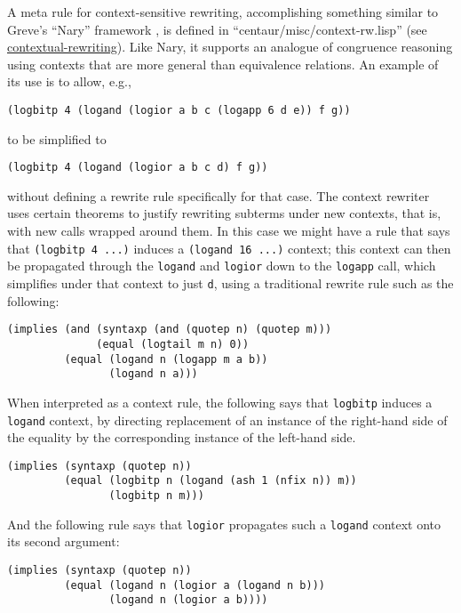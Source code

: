 A meta rule for context-sensitive rewriting, accomplishing something
similar to Greve's ``Nary'' framework \cite{greve06}, is defined in
``centaur/misc/context-rw.lisp'' (see
\href{http://www.cs.utexas.edu/users/moore/acl2/manuals/current/manual/index.html?topic=ACL2\_\_\_\_CONTEXTUAL-REWRITING}{\underline{contextual-rewriting}}).
Like Nary, it supports an analogue of congruence reasoning using
contexts that are more general than equivalence relations.  An example
of its use is to allow, e.g.,
\begin{verbatim}
(logbitp 4 (logand (logior a b c (logapp 6 d e)) f g))
\end{verbatim}
\noindent to be simplified to
\begin{verbatim}
(logbitp 4 (logand (logior a b c d) f g))
\end{verbatim}
without defining a rewrite rule specifically for that case. The
context rewriter uses certain theorems to justify rewriting subterms
under new contexts, that is, with new calls wrapped around them.  In
this case we might have a rule that says that \texttt{(logbitp 4 ...)}
induces a \texttt{(logand 16 ...)} context; this context can then be
propagated through the \texttt{logand} and \texttt{logior} down to the
\texttt{logapp} call, which simplifies under that context to just
\texttt{d}, using a traditional rewrite rule such as the following:
\begin{verbatim}
(implies (and (syntaxp (and (quotep n) (quotep m)))
              (equal (logtail m n) 0))
         (equal (logand n (logapp m a b))
                (logand n a)))
\end{verbatim}
\noindent When interpreted as a context rule, the following says that
\texttt{logbitp} induces a \texttt{logand} context, by directing
replacement of an instance of the right-hand side of the equality by
the corresponding instance of the left-hand side.
\begin{verbatim}
(implies (syntaxp (quotep n))
         (equal (logbitp n (logand (ash 1 (nfix n)) m))
                (logbitp n m)))
\end{verbatim}
\noindent And the following rule says that \texttt{logior} propagates such a
\texttt{logand} context onto its second argument:
\begin{verbatim}
(implies (syntaxp (quotep n))
         (equal (logand n (logior a (logand n b)))
                (logand n (logior a b))))
\end{verbatim}
